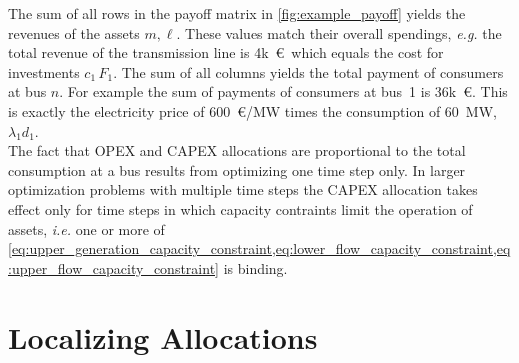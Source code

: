 \documentclass[11pt,twocolumn]{article}
\newcommand{\ie}{\textit{i.e.} }
\newcommand{\slackk}[1][n]{k^*_{#1}}
\begin{document}
The sum of all rows in the payoff matrix in \cref{fig:example_payoff} yields the revenues of the assets $m, \ell$. These values match their overall spendings, \textit{e.g.} the total revenue of the transmission line is 4k~\euro\, which equals the cost for investments $c_{1}\,F_{1}$. The sum of all columns yields the total payment of consumers at bus $n$. For example the sum of payments of consumers at bus~1 is 36k~\euro. This is exactly the electricity price of 600~\euro/MW times the consumption of 60~MW, $\lambda_1 d_1$. \\

The fact that OPEX and CAPEX allocations are proportional to the total consumption at a bus results from optimizing one time step only. In larger optimization problems with multiple time steps the CAPEX allocation takes effect only for time steps in which capacity contraints limit the operation of assets, \ie one or more of  \cref{eq:upper_generation_capacity_constraint,eq:lower_flow_capacity_constraint,eq:upper_flow_capacity_constraint} is binding.  

\section{Localizing Allocations}
\label{sec:localizing_allocations}
\end{document}

